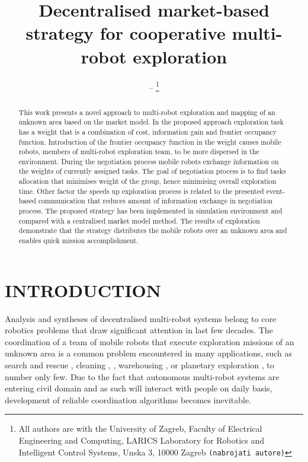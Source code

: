 \documentclass[letterpaper, 10 pt, conference]{ieeeconf}  %
\title{\LARGE \bf
Decentralised market-based strategy for cooperative multi-robot exploration 
}
\author{--%
\thanks{ All authors are with the University of Zagreb, Faculty of Electrical Engineering and Computing, LARICS Laboratory for Robotics and Intelligent Control Systems, Unska 3, 10000 Zagreb
 {\tt\small (nabrojati autore)}}%
}
\begin{document}
\maketitle
\thispagestyle{empty}
\pagestyle{empty}


\begin{abstract}

This work presents a novel approach to multi-robot exploration and mapping of an unknown area based on the market model. In the proposed approach exploration task has a weight that is a combination of cost, information gain and frontier occupancy function. Introduction of the frontier occupancy function in the weight causes mobile robots, members of multi-robot exploration team, to be more dispersed in the environment. During the negotiation process mobile robots exchange information on the weights of currently assigned tasks. The goal of negotiation process is to find tasks allocation that minimises weight of the group, hence minimising overall exploration time. Other factor the speeds up exploration process is related to the presented event-based communication that reduces amount of information exchange in negotiation process. The proposed strategy has been implemented in simulation environment and compared with a centralised market model method. The results of exploration demonstrate that the strategy distributes the mobile robots over an unknown area and enables quick mission accomplishment. 

\end{abstract}

 
\section{INTRODUCTION}
Analysis and syntheses of decentralised multi-robot systems belong to core robotics problems that draw significant attention in last few decades. The coordination of a team of mobile robots that execute exploration missions of an unknown area is a common problem encountered in many applications, such as search and rescue \cite{rescue}, cleaning \cite{cleaning1}, \cite{cleaning2}, warehousing \cite{Wurman}, or planetary exploration \cite{planetary}, to number only few. Due to the fact that autonomous multi-robot systems are entering civil domain and as such will interact with people on daily basis, development of reliable coordination algorithms becomes inevitable.
\end{document}
